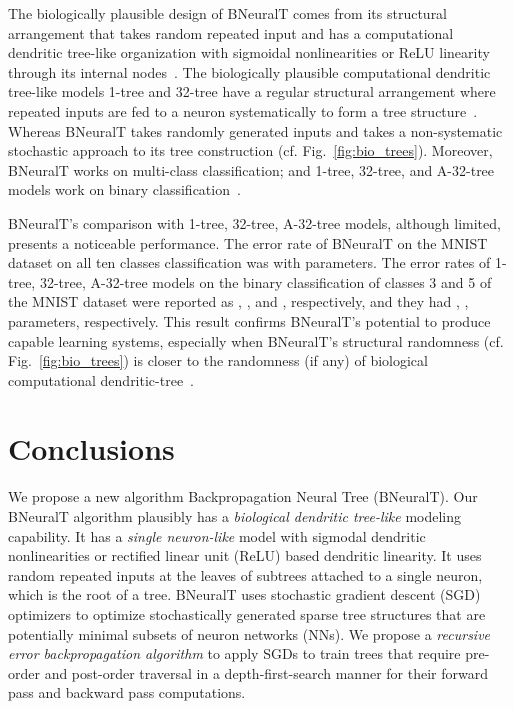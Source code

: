 \documentclass[11pt,a4paper]{article}
\begin{document}
    The biologically plausible design of BNeuralT comes from its structural arrangement that takes random repeated input and has a computational dendritic tree-like organization with sigmoidal nonlinearities or ReLU linearity through its internal nodes~\citep{london2005dendritic}. The biologically plausible computational dendritic tree-like models 1-tree and 32-tree have a regular structural arrangement where repeated inputs are fed to a neuron systematically to form a tree structure~\citep{jones2021might}. Whereas BNeuralT takes randomly generated inputs and takes a non-systematic stochastic approach to its tree construction (cf. Fig.~\ref{fig:bio_trees}). Moreover, BNeuralT works on multi-class classification; and 1-tree, 32-tree, and  A-32-tree models work on binary classification~\citep{jones2021might}.
    
    BNeuralT's comparison with 1-tree,  32-tree, A-32-tree models, although limited, presents a noticeable performance. The error rate of BNeuralT on the MNIST dataset on all ten classes classification was  with  parameters. The error rates of 1-tree, 32-tree, A-32-tree models on the binary classification of classes 3 and 5 of the MNIST dataset were reported as ,  ,  and  , respectively, and they had , ,  parameters, respectively. This result confirms BNeuralT's potential to produce capable learning systems, especially when BNeuralT's structural randomness (cf. Fig.~\ref{fig:bio_trees}) is closer to the  randomness (if any) of biological computational dendritic-tree~\citep{travis2005regional}.
    
    
    \section{Conclusions}
    \label{sec:con}
We propose a new algorithm Backpropagation Neural Tree (BNeuralT).  
    Our BNeuralT algorithm plausibly has a \textit{biological dendritic tree-like} modeling capability. It has a \textit{single neuron-like} model with sigmodal dendritic nonlinearities or rectified linear unit (ReLU) based dendritic linearity. It uses random repeated inputs at the leaves of subtrees attached to a single neuron, which is the root of a tree. BNeuralT uses stochastic gradient descent (SGD) optimizers to optimize stochastically generated sparse tree structures that are potentially minimal subsets of neuron networks (NNs). We propose a \textit{recursive error backpropagation algorithm} to apply SGDs to train trees that require pre-order and post-order traversal in a depth-first-search manner for their forward pass and backward pass computations.
    
\end{document}
